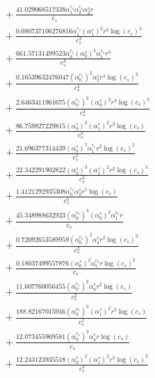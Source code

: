 \documentclass[10pt]{article}
\begin{document}
\begin{align*}
&{}  + \frac{41.029068517338 \alpha_{1}^{c_s} \alpha_{2}^{c_s} \alpha_{2}^s r}{c_{s}} \\
&{}  + \frac{0.080737106276816 \alpha_{1}^{c_s} \left(\alpha_{1}^s\right)^{2} r^{3} \log{\left(c_{s} \right)}^{4}}{c_{s}^{3}} \\
&{}  + \frac{661.57131499523 \alpha_{0}^{c_s} \left(\alpha_{0}^s\right)^{3} \alpha_{1}^{c_s} r^{3}}{c_{s}^{3}} \\
&{}  + \frac{0.16539632476047 \left(\alpha_{0}^{c_s}\right)^{2} \alpha_{2}^s r^{4} \log{\left(c_{s} \right)}^{3}}{c_{s}^{4}} \\
&{}  + \frac{2.6463411961675 \left(\alpha_{0}^{c_s}\right)^{2} \left(\alpha_{0}^s\right)^{3} r^{4} \log{\left(c_{s} \right)}^{3}}{c_{s}^{4}} \\
&{}  + \frac{86.759827229815 \left(\alpha_{0}^s\right)^{2} \left(\alpha_{1}^s\right)^{2} r^{3} \log{\left(c_{s} \right)}}{c_{s}^{3}} \\
&{}  + \frac{21.696377314439 \left(\alpha_{0}^s\right)^{5} \alpha_{1}^{c_s} r^{2} \log{\left(c_{s} \right)}^{2}}{c_{s}^{2}} \\
&{}  + \frac{22.342291902822 \left(\alpha_{0}^s\right)^{3} \left(\alpha_{1}^s\right)^{2} r^{2} \log{\left(c_{s} \right)}^{3}}{c_{s}^{2}} \\
&{}  + \frac{1.4121292935308 \alpha_{0}^{c_s} \alpha_{2}^s r^{5} \log{\left(c_{s} \right)}}{c_{s}^{5}} \\
&{}  + \frac{45.348988632923 \left(\alpha_{0}^{c_s}\right)^{4} \left(\alpha_{0}^s\right)^{2} \alpha_{1}^{c_s} r}{c_{s}} \\
&{}  + \frac{0.72092653589959 \left(\alpha_{0}^{c_s}\right)^{2} \alpha_{4}^s r^{2} \log{\left(c_{s} \right)}^{3}}{c_{s}^{2}} \\
&{}  + \frac{0.18037499557876 \left(\alpha_{0}^s\right)^{2} \alpha_{5}^{c_s} r \log{\left(c_{s} \right)}^{2}}{c_{s}} \\
&{}  + \frac{11.607760056455 \left(\alpha_{0}^{c_s}\right)^{2} \alpha_{4}^s r^{2} \log{\left(c_{s} \right)}}{c_{s}^{2}} \\
&{}  + \frac{188.82167015916 \left(\alpha_{0}^{c_s}\right)^{3} \left(\alpha_{1}^s\right)^{2} r^{2} \log{\left(c_{s} \right)}}{c_{s}^{2}} \\
&{}  + \frac{12.073455969581 \left(\alpha_{0}^{c_s}\right)^{3} \alpha_{4}^s r \log{\left(c_{s} \right)}}{c_{s}} \\
&{}  + \frac{12.243123935518 \left(\alpha_{0}^s\right)^{2} \left(\alpha_{1}^s\right)^{2} r^{3} \log{\left(c_{s} \right)}^{3}}{c_{s}^{3}} \\

\end{align*}
\end{document}
